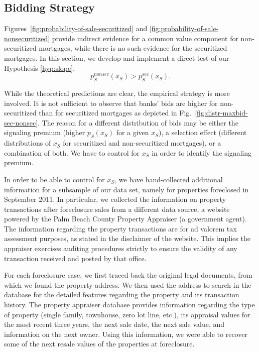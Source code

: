 \documentclass[11pt,twopage]{article}
\begin{document}

\subsection{Bidding Strategy}

Figures~\ref{fig:probability-of-sale-securitized} and
\ref{fig:probability-of-sale-nonsecuritized} provide indirect evidence
for a common value component for non-securitized mortgages, while
there is no such evidence for the securitized mortgages. In this
section, we develop and implement a direct test of our Hypothesis
\ref{hyp:slope},
\[ p_S^{nonsec}(x_S) > p_S^{sec}(x_S).\]

While the theoretical predictions are clear, the empirical strategy is
more involved. It is not sufficient to observe that banks' bids are
higher for non-securitized than for securitized mortgages as depicted
in Fig.~\ref{fig:distr-maxbid-sec-nonsec}. The reason for a different
distribution of bids may be either the signaling premium (higher
$p_S(x_S)$ for a given $x_S$), a selection effect (different
distributions of $x_S$ for securitized and non-securitized mortgages),
or a combination of both. We have to control for $x_S$ in order to
identify the signaling premium.


In order to be able to control for $x_S$, we have hand-collected
additional information for a subsample of our data set, namely for
properties foreclosed in September 2011. In particular, we collected
the information on property transactions after foreclosure sales from
a different data source, a website powered by the Palm Beach County
Property Appraiser (a government agent). The information regarding the
property transactions are for ad valorem tax assessment purposes, as
stated in the disclaimer of the website. This implies the appraiser
exercises auditing procedures strictly to ensure the validity of any
transaction received and posted by that office.

For each foreclosure case, we first traced back the original legal
documents, from which we found the property address. We then used the
address to search in the database for the detailed features regarding
the property and its transaction history. The property appraiser
database provides information regarding the type of property (single
family, townhouse, zero lot line, etc.), its appraisal values for the
most recent three years, the next sale date, the next sale value, and
information on the next owner. Using this information, we were able to
recover some of the next resale values of the properties at
foreclosure.
\end{document}
